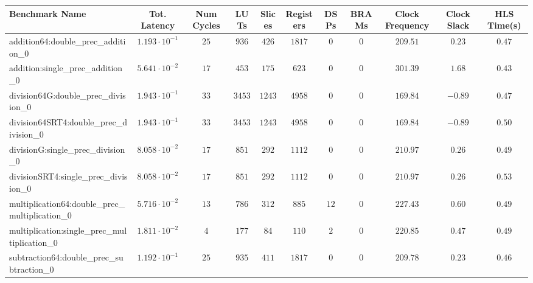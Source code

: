 \begin{tabular}{|l|c|c|c|c|c|c|c|c|c|c|}
\hline
Benchmark Name                                   & Tot. Latency            & Num Cycles & LUTs      & Slices   & Registers & DSPs   & BRAMs & Clock Frequency & Clock Slack & HLS Time(s) \\
\hline
addition64:double\_prec\_addition\_0             & $ 1.193 \cdot 10^{-1} $ & $ 25     $ & $ 936   $ & $ 426  $ & $ 1817  $ & $ 0  $ & $ 0 $ & $ 209.51      $ & $ 0.23    $ & $ 0.47    $ \\
addition:single\_prec\_addition\_0               & $ 5.641 \cdot 10^{-2} $ & $ 17     $ & $ 453   $ & $ 175  $ & $ 623   $ & $ 0  $ & $ 0 $ & $ 301.39      $ & $ 1.68    $ & $ 0.43    $ \\
division64G:double\_prec\_division\_0            & $ 1.943 \cdot 10^{-1} $ & $ 33     $ & $ 3453  $ & $ 1243 $ & $ 4958  $ & $ 0  $ & $ 0 $ & $ 169.84      $ & $ -0.89   $ & $ 0.47    $ \\
division64SRT4:double\_prec\_division\_0         & $ 1.943 \cdot 10^{-1} $ & $ 33     $ & $ 3453  $ & $ 1243 $ & $ 4958  $ & $ 0  $ & $ 0 $ & $ 169.84      $ & $ -0.89   $ & $ 0.50    $ \\
divisionG:single\_prec\_division\_0              & $ 8.058 \cdot 10^{-2} $ & $ 17     $ & $ 851   $ & $ 292  $ & $ 1112  $ & $ 0  $ & $ 0 $ & $ 210.97      $ & $ 0.26    $ & $ 0.49    $ \\
divisionSRT4:single\_prec\_division\_0           & $ 8.058 \cdot 10^{-2} $ & $ 17     $ & $ 851   $ & $ 292  $ & $ 1112  $ & $ 0  $ & $ 0 $ & $ 210.97      $ & $ 0.26    $ & $ 0.53    $ \\
multiplication64:double\_prec\_multiplication\_0 & $ 5.716 \cdot 10^{-2} $ & $ 13     $ & $ 786   $ & $ 312  $ & $ 885   $ & $ 12 $ & $ 0 $ & $ 227.43      $ & $ 0.60    $ & $ 0.49    $ \\
multiplication:single\_prec\_multiplication\_0   & $ 1.811 \cdot 10^{-2} $ & $ 4      $ & $ 177   $ & $ 84   $ & $ 110   $ & $ 2  $ & $ 0 $ & $ 220.85      $ & $ 0.47    $ & $ 0.49    $ \\
subtraction64:double\_prec\_subtraction\_0       & $ 1.192 \cdot 10^{-1} $ & $ 25     $ & $ 935   $ & $ 411  $ & $ 1817  $ & $ 0  $ & $ 0 $ & $ 209.78      $ & $ 0.23    $ & $ 0.46    $ \\

\end{tabular}
